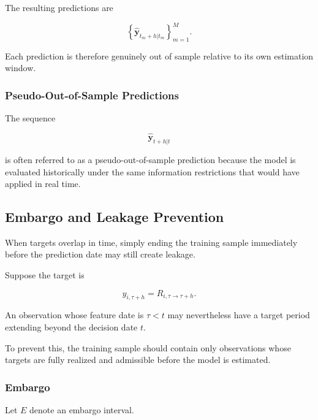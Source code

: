 \documentclass[11pt,a4paper]{article}
\begin{document}
The resulting predictions are

\begin{equation}
\boxed{
\left\{
\widehat{\mathbf{y}}_{t_m+h|t_m}
\right\}_{m=1}^{M}.
}
\end{equation}

Each prediction is therefore genuinely out of sample relative to its own
estimation window.


\subsubsection{Pseudo-Out-of-Sample Predictions}

The sequence

\begin{equation}
\widehat{\mathbf{y}}_{t+h|t}
\end{equation}

is often referred to as a pseudo-out-of-sample prediction because the model is
evaluated historically under the same information restrictions that would have
applied in real time.


\subsection{Embargo and Leakage Prevention}
\label{subsec:embargo_leakage}

When targets overlap in time, simply ending the training sample immediately
before the prediction date may still create leakage.

Suppose the target is

\begin{equation}
y_{i,\tau+h}
=
R_{i,\tau\rightarrow\tau+h}.
\end{equation}

An observation whose feature date is $\tau<t$ may nevertheless have a target
period extending beyond the decision date $t$.

To prevent this, the training sample should contain only observations whose
targets are fully realized and admissible before the model is estimated.


\subsubsection{Embargo}

Let $E$ denote an embargo interval.
\end{document}
